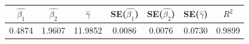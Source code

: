 \begin{tabular}{ccccccc}
\toprule
$\hat{\beta_1}$ & $\hat{\beta_2}$ & $\hat{\gamma}$ & SE($\hat{\beta_1}$) & SE($\hat{\beta_2}$) & SE($\hat{\gamma}$) & $R^2$ \\
\midrule
0.4874 & 1.9607 & 11.9852 & 0.0086 & 0.0076 & 0.0730 & 0.9899 \\
\bottomrule
\end{tabular}
